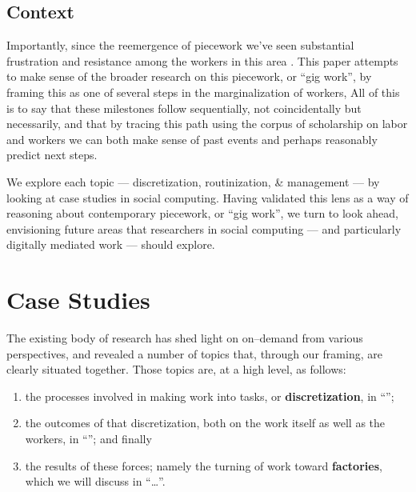 \documentclass{sigchi}
\newcommand{\msb}[1]{{\color{PineGreen}[MSB: #1]}}
\begin{document}
\subsection{Context}
Importantly, since the reemergence of piecework we've seen substantial frustration
and resistance among the workers in this area
\cite{uberAlgorithm,turkopticon,dynamo}.
This paper attempts to make sense of the broader research on this piecework,
or ``gig work'', by framing this as one of several steps in the marginalization of workers,
%
%
%
% 
All of this is to say that these milestones follow sequentially,
not coincidentally but necessarily,
and that by tracing this path using the corpus of scholarship on labor and workers
we can both make sense of past events and perhaps reasonably predict next steps.

We explore each topic
--- discretization, routinization, \& management ---
by looking at case studies in social computing.
Having validated this lens as a way of reasoning about contemporary piecework, or ``gig work'',
we turn to look ahead, envisioning future areas that researchers in social computing
--- and particularly digitally mediated work ---
should explore.  

\section{Case Studies}
The existing body of research has shed light on on--demand from various perspectives,
and revealed a number of topics that,
through our framing, are clearly situated together.
Those topics are, at a high level, as follows:
\begin{enumerate}
\item the processes involved in making work into tasks, or \textbf{discretization},
in ``'';
\item the outcomes of that discretization, both on the work itself as well as the workers,
in ``'';
and finally
\item the results of these forces; namely the turning of work toward \textbf{factories},
which we will discuss in ``\dots''.
\end{enumerate}
\end{document}
